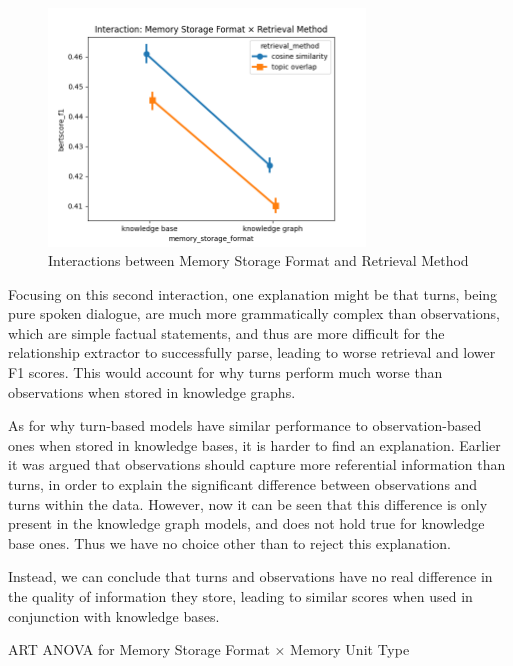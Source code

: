 \begin{figure}[p]
\centering
\includegraphics[width=0.75\textwidth]{charts/interaction_memory_storage_format_x_retrieval_method.png}
\caption{Interactions between Memory Storage Format and Retrieval Method}
\label{fig:interaction_memory_storage_format_x_retrieval_method}
\end{figure}


Focusing on this second interaction, one explanation might be that turns, being pure spoken dialogue, are much more grammatically complex than observations, which are simple factual statements, and thus are more difficult for the relationship extractor to successfully parse, leading to worse retrieval and lower F1 scores. This would account for why turns perform much worse than observations when stored in knowledge graphs. 

As for why turn-based models have similar performance to observation-based ones when stored in knowledge bases, it is harder to find an explanation. Earlier it was argued that observations should capture more referential information than turns, in order to explain the significant difference between observations and turns within the data. However, now it can be seen that this difference is only present in the knowledge graph models, and does not hold true for knowledge base ones. Thus we have no choice other than to reject this explanation. 

Instead, we can conclude that turns and observations have no real difference in the quality of information they store, leading to similar scores when used in conjunction with knowledge bases.

\begin{table}[htbp]
\centering
\tiny

\caption{ART ANOVA for Memory Storage Format × Memory Unit Type}
\label{tab:memory_storage_format_x_memory_unit_type_table}
\end{table}


